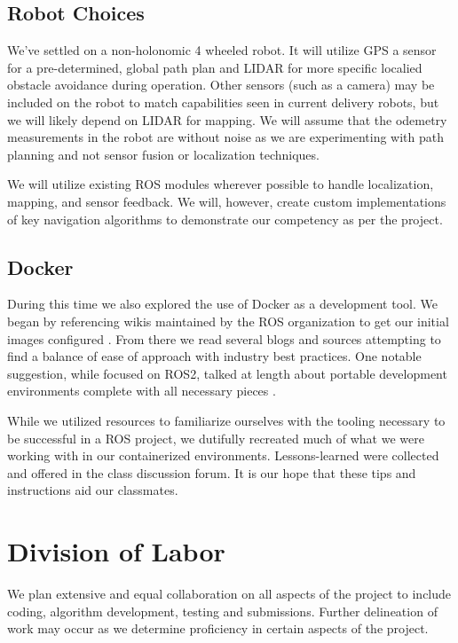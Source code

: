 \documentclass{article}
\begin{document}
\begin{multicols}{2}
\subsection*{Robot Choices}
We've settled on a non-holonomic 4 wheeled robot. It will utilize GPS a sensor for a pre-determined, global path plan and LIDAR for more specific localied obstacle avoidance during operation. Other sensors (such as a camera) may be included on the robot to match capabilities seen in current delivery robots, but we will likely depend on LIDAR for mapping. We will assume that the odemetry measurements in the robot are without noise as we are experimenting with path planning and not sensor fusion or localization techniques.

We will utilize existing ROS modules wherever possible to handle localization, mapping, and sensor feedback. We will, however, create custom implementations of key navigation algorithms to demonstrate our competency as per the project.

\subsection*{Docker}
During this time we also explored the use of Docker as a development tool. We began by referencing wikis maintained by the ROS organization to get our initial images configured \cite{ROS-Docker}. From there we read several blogs and sources attempting to find a balance of ease of approach with industry best practices. One notable suggestion, while focused on ROS2, talked at length about portable development environments complete with all necessary pieces \cite{Thackston}.

While we utilized resources to familiarize ourselves with the tooling necessary to be successful in a ROS project, we dutifully recreated much of what we were working with in our containerized environments. Lessons-learned were collected and offered in the class discussion forum. It is our hope that these tips and instructions aid our classmates.

\section*{Division of Labor}
We plan extensive and equal collaboration on all aspects of the project to include coding, algorithm development, testing and submissions. Further delineation of work may occur as we determine proficiency in certain aspects of the project.


\label{References}


\end{multicols}
\end{document}
